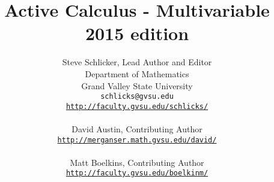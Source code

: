 \documentclass[11pt]{book}
\title{Active Calculus - Multivariable \\ \vspace{0.02in} \small{2015 edition} \\ \vspace{0.1in} \scalebox{0.75}{\texttt{[image: figures/CClicense.eps]}}}
\author{Steve Schlicker, Lead Author and Editor \\ Department of Mathematics \\ Grand Valley State University \\
\texttt{schlicks@gvsu.edu} \\
\href{http://faculty.gvsu.edu/schlicks/}{\texttt{http://faculty.gvsu.edu/schlicks/}}\\
\vspace{1.5in} \\
David Austin, Contributing Author \\
\href{http://merganser.math.gvsu.edu/david/}{\texttt{http://merganser.math.gvsu.edu/david/}} \\ \ \\
Matt Boelkins, Contributing Author \\
\href{http://faculty.gvsu.edu/boelkinm/}{\texttt{http://faculty.gvsu.edu/boelkinm/}} }
\theoremstyle{definition}
\begin{document}
\frontmatter
\maketitle
\tableofcontents


\mainmatter




\pagebreak

\backmatter
	
\printindex
\end{document}
